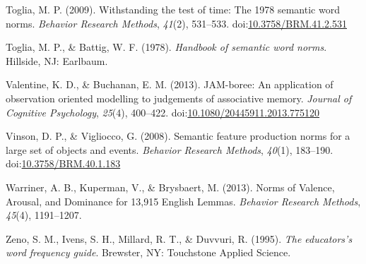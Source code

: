 \documentclass[english,man]{apa6}
\theoremstyle{definition}
\theoremstyle{definition}
\theoremstyle{definition}
\theoremstyle{remark}
\begin{document}
\hypertarget{ref-Toglia2009}{}
Toglia, M. P. (2009). Withstanding the test of time: The 1978 semantic
word norms. \emph{Behavior Research Methods}, \emph{41}(2), 531--533.
doi:\href{https://doi.org/10.3758/BRM.41.2.531}{10.3758/BRM.41.2.531}

\hypertarget{ref-Toglia1978}{}
Toglia, M. P., \& Battig, W. F. (1978). \emph{Handbook of semantic word
norms}. Hillside, NJ: Earlbaum.

\hypertarget{ref-Valentine2013}{}
Valentine, K. D., \& Buchanan, E. M. (2013). JAM-boree: An application
of observation oriented modelling to judgements of associative memory.
\emph{Journal of Cognitive Psychology}, \emph{25}(4), 400--422.
doi:\href{https://doi.org/10.1080/20445911.2013.775120}{10.1080/20445911.2013.775120}

\hypertarget{ref-Vinson2008}{}
Vinson, D. P., \& Vigliocco, G. (2008). Semantic feature production
norms for a large set of objects and events. \emph{Behavior Research
Methods}, \emph{40}(1), 183--190.
doi:\href{https://doi.org/10.3758/BRM.40.1.183}{10.3758/BRM.40.1.183}

\hypertarget{ref-Warriner2013}{}
Warriner, A. B., Kuperman, V., \& Brysbaert, M. (2013). Norms of
Valence, Arousal, and Dominance for 13,915 English Lemmas.
\emph{Behavior Research Methods}, \emph{45}(4), 1191--1207.

\hypertarget{ref-Zeno1995}{}
Zeno, S. M., Ivens, S. H., Millard, R. T., \& Duvvuri, R. (1995).
\emph{The educators's word frequency guide}. Brewster, NY: Touchstone
Applied Science.
\end{document}
